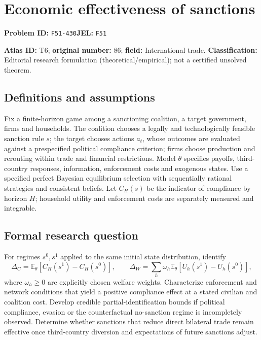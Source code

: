 \documentclass[11pt,a4paper]{article}
\begin{document}
\section*{Economic effectiveness of sanctions}
\textbf{Problem ID:} \texttt{F51-430}\quad \textbf{JEL:} \texttt{F51}\par
\label{problem:OP-0086}
\label{atlas:prob:T6}

\noindent\textbf{Atlas ID:} T6; \textbf{original number:} 86; \textbf{field:} International trade. \textbf{Classification:} Editorial research formulation (theoretical/empirical); not a certified unsolved theorem.

\subsection*{Definitions and assumptions}
Fix a finite-horizon game among a sanctioning coalition, a target government, firms and households. The coalition chooses a legally and technologically feasible sanction rule $s$; the target chooses actions $a_t$, whose outcomes are evaluated against a prespecified political compliance criterion; firms choose production and rerouting within trade and financial restrictions. Model $\theta$ specifies payoffs, third-country responses, information, enforcement costs and exogenous states. Use a specified perfect Bayesian equilibrium selection with sequentially rational strategies and consistent beliefs. Let $C_H(s)$ be the indicator of compliance by horizon $H$; household utility and enforcement costs are separately measured and integrable.

\subsection*{Formal research question}
For regimes $s^0,s^1$ applied to the same initial state distribution, identify
\[
 \Delta_C=\mathbb E_\theta[C_H(s^1)-C_H(s^0)],
 \qquad
 \Delta_W=\sum_h\omega_h\mathbb E_\theta[U_h(s^1)-U_h(s^0)],
\]
where $\omega_h\ge0$ are explicitly chosen welfare weights. Characterize enforcement and network conditions that yield a positive compliance effect at a stated civilian and coalition cost. Develop credible partial-identification bounds if political compliance, evasion or the counterfactual no-sanction regime is incompletely observed. Determine whether sanctions that reduce direct bilateral trade remain effective once third-country diversion and expectations of future sanctions adjust.
\end{document}
